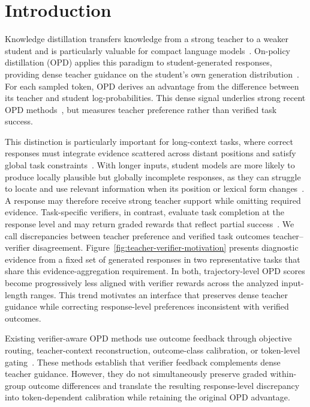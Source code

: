 \section{Introduction}

Knowledge distillation transfers knowledge from a strong teacher to a weaker student and is particularly valuable for compact language models~\citep{hinton2015distilling,gu2024minillm,pmlr-v235-ko24c}. On-policy distillation (OPD) applies this paradigm to student-generated responses, providing dense teacher guidance on the student's own generation distribution~\citep{agarwal2024policy}. For each sampled token, OPD derives an advantage from the difference between its teacher and student log-probabilities. This dense signal underlies strong recent OPD methods~\citep{yang2026learning,li2026filter,zhao2026poweropd}, but measures teacher preference rather than verified task success.

This distinction is particularly important for long-context tasks, where correct responses must integrate evidence scattered across distant positions and satisfy global task constraints~\citep{bai2024longbench,hsieh2024ruler,goldman2024really,bai2025longbench}. With longer inputs, student models are more likely to produce locally plausible but globally incomplete responses, as they can struggle to locate and use relevant information when its position or lexical form changes~\citep{liu2024lost,pmlr-v267-modarressi25a}. A response may therefore receive strong teacher support while omitting required evidence. Task-specific verifiers, in contrast, evaluate task completion at the response level and may return graded rewards that reflect partial success~\citep{shao2024deepseekmath}. We call discrepancies between teacher preference and verified task outcomes teacher--verifier disagreement. Figure~\ref{fig:teacher-verifier-motivation} presents diagnostic evidence from a fixed set of generated responses in two representative tasks that share this evidence-aggregation requirement. In both, trajectory-level OPD scores become progressively less aligned with verifier rewards across the analyzed input-length ranges. This trend motivates an interface that preserves dense teacher guidance while correcting response-level preferences inconsistent with verified outcomes.

Existing verifier-aware OPD methods use outcome feedback through objective routing, teacher-context reconstruction, outcome-class calibration, or token-level gating~\citep{zheng2026scope,yu2026multi,hou2026uni,xu2026sg}. These methods establish that verifier feedback complements dense teacher guidance. However, they do not simultaneously preserve graded within-group outcome differences and translate the resulting response-level discrepancy into token-dependent calibration while retaining the original OPD advantage.

